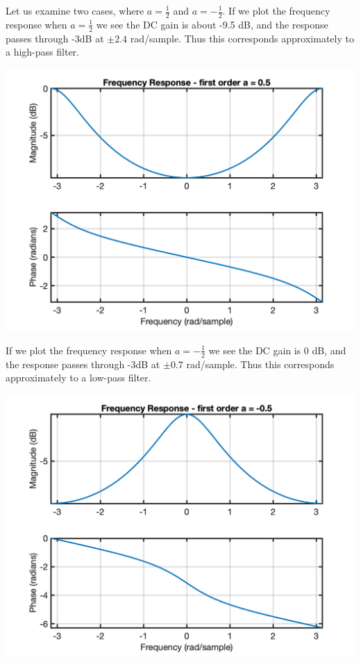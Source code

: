 \begin{example}
Let us examine two cases, where $a = \tfrac{1}{2}$ and $a = -\tfrac{1}{2}$. If we plot the frequency response when $a = \tfrac{1}{2}$ we see the DC gain is about -9.5 dB, and the response passes through -3dB at $\pm 2.4$ rad/sample. Thus this corresponds approximately to a high-pass filter. 
\begin{center}   
  \includegraphics[scale=0.7]{graphics/lecture25_1.png}
\end{center}
If we plot the frequency response when $a = -\tfrac{1}{2}$ we see the DC gain is 0 dB, and the response passes through -3dB at $\pm 0.7$ rad/sample. Thus this corresponds approximately to a low-pass filter. 
\begin{center}   
  \includegraphics[scale=0.7]{graphics/lecture25_2.png}
\end{center}

\end{example}

